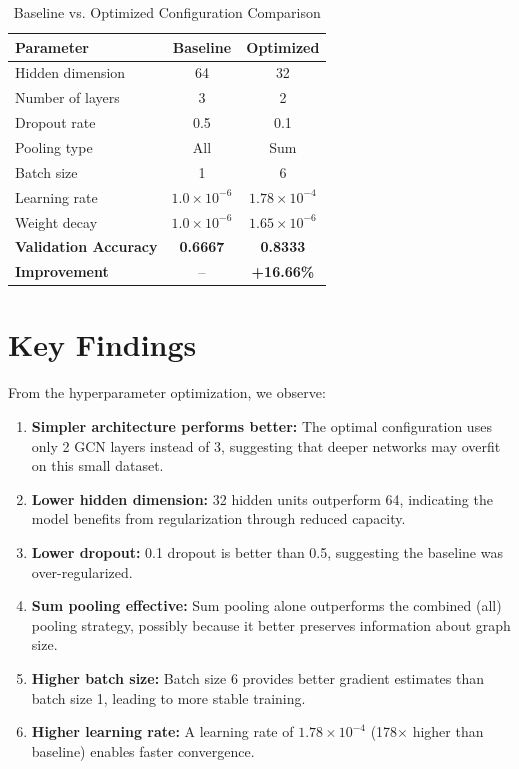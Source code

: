 \begin{table}[H]
\centering
\caption{Baseline vs. Optimized Configuration Comparison}
\label{tab:baseline_vs_optimized}
\begin{tabular}{lcc}
\toprule
\textbf{Parameter} & \textbf{Baseline} & \textbf{Optimized} \\
\midrule
Hidden dimension & 64 & 32 \\
Number of layers & 3 & 2 \\
Dropout rate & 0.5 & 0.1 \\
Pooling type & All & Sum \\
Batch size & 1 & 6 \\
Learning rate & $1.0 \times 10^{-6}$ & $1.78 \times 10^{-4}$ \\
Weight decay & $1.0 \times 10^{-6}$ & $1.65 \times 10^{-6}$ \\
\midrule
\textbf{Validation Accuracy} & \textbf{0.6667} & \textbf{0.8333} \\
\textbf{Improvement} & -- & \textbf{+16.66\%} \\
\bottomrule
\end{tabular}
\end{table}

\section{Key Findings}

From the hyperparameter optimization, we observe:

\begin{enumerate}
    \item \textbf{Simpler architecture performs better:} The optimal configuration uses only 2 GCN layers instead of 3, suggesting that deeper networks may overfit on this small dataset.
    
    \item \textbf{Lower hidden dimension:} 32 hidden units outperform 64, indicating the model benefits from regularization through reduced capacity.
    
    \item \textbf{Lower dropout:} 0.1 dropout is better than 0.5, suggesting the baseline was over-regularized.
    
    \item \textbf{Sum pooling effective:} Sum pooling alone outperforms the combined (all) pooling strategy, possibly because it better preserves information about graph size.
    
    \item \textbf{Higher batch size:} Batch size 6 provides better gradient estimates than batch size 1, leading to more stable training.
    
    \item \textbf{Higher learning rate:} A learning rate of $1.78 \times 10^{-4}$ (178$\times$ higher than baseline) enables faster convergence.
\end{enumerate}

